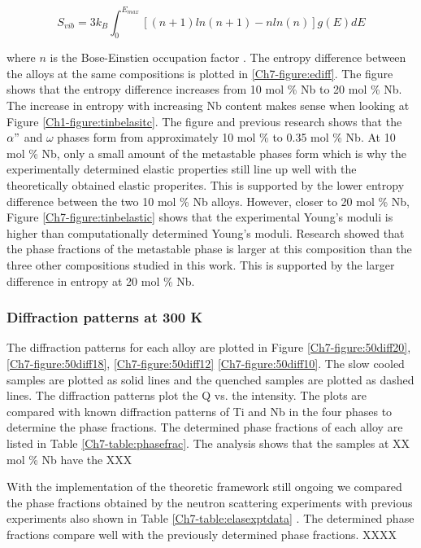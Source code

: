 \begin{equation}
\label{eq:phononentropy}
S_{vib} = 3 k_{B} \int_{0}^{E_{max}} \left[ \left( n+1 \right) ln\left(n+1\right) -n ln\left(n\right) \right] g(E) dE
\end{equation}

\noindent where $n$ is the Bose-Einstien occupation factor \cite{Budai2014}. The entropy difference between the alloys at the same compositions is plotted in \ref{Ch7-figure:ediff}. The figure shows that the entropy difference increases from 10 mol \% Nb to 20 mol \% Nb. The increase in entropy with increasing Nb content makes sense when looking at Figure \ref{Ch1-figure:tinbelasitc}. The figure and previous research shows that the $\alpha"$ and $\omega$ phases form from approximately 10 mol \% to 0.35 mol \% Nb. At 10 mol \% Nb, only a small amount of the metastable phases form which is why the experimentally determined elastic properties still line up well with the theoretically obtained elastic properites. This is supported by the lower entropy difference between the two 10 mol \% Nb alloys. However, closer to 20 mol \% Nb, Figure \ref{Ch7-figure:tinbelastic} shows that the experimental Young's moduli is higher than computationally determined Young's moduli. Research showed that the phase fractions of the metastable phase is larger at this composition than the three other compositions studied in this work. This is supported by the larger difference in entropy at 20 mol \% Nb.

\subsubsection{Diffraction patterns at 300 K}

The diffraction patterns for each alloy are plotted in Figure \ref{Ch7-figure:50diff20}, \ref{Ch7-figure:50diff18}, \ref{Ch7-figure:50diff12} \ref{Ch7-figure:50diff10}. The slow cooled samples are plotted as solid lines and the quenched samples are plotted as dashed lines. The diffraction patterns plot the Q vs. the intensity. The plots are compared with known diffraction patterns of Ti and Nb in the four phases to determine the phase fractions. The determined phase fractions of each alloy are listed in Table \ref{Ch7-table:phasefrac}. The analysis shows that the samples at XX mol \% Nb have the XXX 

With the implementation of the theoretic framework still ongoing we compared the phase fractions obtained by the neutron scattering experiments with previous experiments also shown in Table \ref{Ch7-table:elasexptdata} \cite{Ozaki2004,Timoshevskii2011,Friak2012,Karre2015}. The determined phase fractions compare well with the previously determined phase fractions. XXXX

